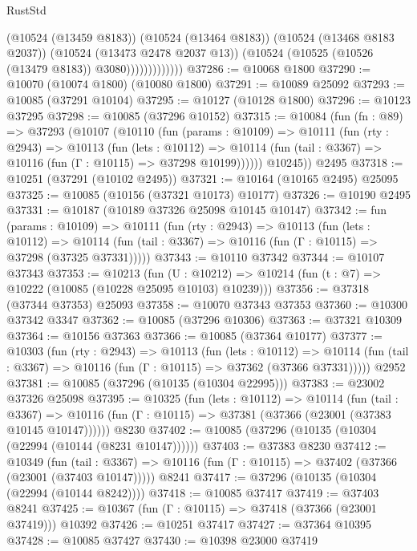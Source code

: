 \begin{lexlean}{RustStd}
\begin{coremodule}
                          (@10524 (@13459 @8183))
                          (@10524 (@13464 @8183))
                          (@10524 (@13468 @8183 @2037))
                          (@10524 (@13473 @2478 @2037 @13))
                          (@10524 (@10525 (@10526 (@13479 @8183)) @3080)))))))))))))
@37286 := @10068 @1800
@37290 := @10070 (@10074 @1800) (@10080 @1800)
@37291 := @10089 @25092
@37293 := @10085 (@37291 @10104)
@37295 := @10127 (@10128 @1800)
@37296 := @10123 @37295
@37298 := @10085 (@37296 @10152)
@37315 := @10084
    (fun (fn : @89) =>
    @37293
      (@10107
        (@10110
          (fun (params : @10109) =>
          @10111
            (fun (rty : @2943) =>
            @10113
              (fun (lets : @10112) =>
              @10114 (fun (tail : @3367) => @10116 (fun (Γ : @10115) => @37298 @10199))))))
        @10245))
    @2495
@37318 := @10251 (@37291 (@10102 @2495))
@37321 := @10164 (@10165 @2495) @25095
@37325 := @10085 (@10156 (@37321 @10173) @10177)
@37326 := @10190 @2495
@37331 := @10187 (@10189 @37326 @25098 @10145 @10147)
@37342 := fun (params : @10109) =>
  @10111
    (fun (rty : @2943) =>
    @10113
      (fun (lets : @10112) =>
      @10114 (fun (tail : @3367) => @10116 (fun (Γ : @10115) => @37298 (@37325 @37331)))))
@37343 := @10110 @37342
@37344 := @10107 @37343
@37353 := @10213
    (fun (U : @10212) => @10214 (fun (t : @7) => @10222 (@10085 (@10228 @25095 @10103) @10239)))
@37356 := @37318 (@37344 @37353) @25093
@37358 := @10070 @37343 @37353
@37360 := @10300 @37342 @3347
@37362 := @10085 (@37296 @10306)
@37363 := @37321 @10309
@37364 := @10156 @37363
@37366 := @10085 (@37364 @10177)
@37377 := @10303
    (fun (rty : @2943) =>
    @10113
      (fun (lets : @10112) =>
      @10114 (fun (tail : @3367) => @10116 (fun (Γ : @10115) => @37362 (@37366 @37331)))))
    @2952
@37381 := @10085 (@37296 (@10135 (@10304 @22995)))
@37383 := @23002 @37326 @25098
@37395 := @10325
    (fun (lets : @10112) =>
    @10114
      (fun (tail : @3367) =>
      @10116 (fun (Γ : @10115) => @37381 (@37366 (@23001 (@37383 @10145 @10147))))))
    @8230
@37402 := @10085 (@37296 (@10135 (@10304 (@22994 (@10144 (@8231 @10147))))))
@37403 := @37383 @8230
@37412 := @10349
    (fun (tail : @3367) => @10116 (fun (Γ : @10115) => @37402 (@37366 (@23001 (@37403 @10147)))))
    @8241
@37417 := @37296 (@10135 (@10304 (@22994 (@10144 @8242))))
@37418 := @10085 @37417
@37419 := @37403 @8241
@37425 := @10367 (fun (Γ : @10115) => @37418 (@37366 (@23001 @37419))) @10392
@37426 := @10251 @37417
@37427 := @37364 @10395
@37428 := @10085 @37427
@37430 := @10398 @23000 @37419

\end{coremodule}
\end{lexlean}
